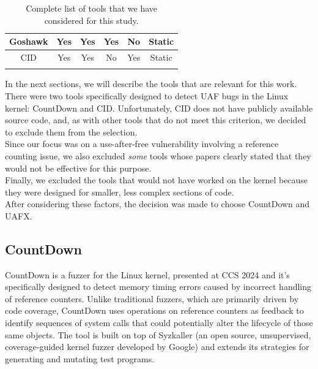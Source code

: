 {\begin{table}[p]
\begin{tabular}{|S{c}|S{c}|S{c}|S{c}|S{c}|S{c}|}
            Goshawk \cite{bib:goshawk} & Yes & Yes & Yes & No & Static \\\hline
            CID \cite{bib:cid} & Yes & Yes & No & Yes & Static \\\hline
        \end{tabular}
        \caption{Complete list of tools that we have considered for this study.}
        \label{table:tools}
    \end{table}
}

\noindent In the next sections, we will describe the tools that are relevant for this work. There were two tools specifically designed to detect UAF bugs in the Linux kernel: CountDown and CID. Unfortunately, CID does not have publicly available source code, and, as with other tools that do not meet this criterion, we decided to exclude them from the selection.\\
Since our focus was on a use-after-free vulnerability involving a reference counting issue, we also excluded \emph{some} tools whose papers clearly stated that they would not be effective for this purpose.\\
Finally, we excluded the tools that would not have worked on the kernel because they were designed for smaller, less complex sections of code.\\
After considering these factors, the decision was made to choose CountDown and UAFX.

\subsection{CountDown}
CountDown is a fuzzer for the Linux kernel, presented at CCS 2024 \cite{bib:countdown} and it's specifically designed to detect memory timing errors caused by incorrect handling of reference counters. Unlike traditional fuzzers, which are primarily driven by code coverage, CountDown uses operations on reference counters as feedback to identify sequences of system calls that could potentially alter the lifecycle of those same objects. The tool is built on top of Syzkaller \cite{bib:syzkaller} (an open source, unsupervised, coverage-guided kernel fuzzer developed by Google) and extends its strategies for generating and mutating test programs.


